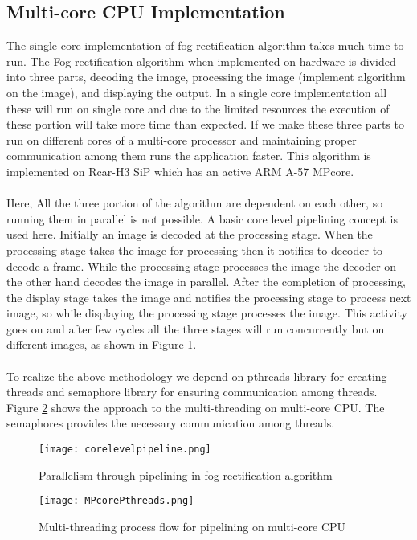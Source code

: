 \subsection{Multi-core CPU Implementation}
The single core implementation of fog rectification algorithm takes much time to run. The Fog rectification algorithm when implemented on hardware is divided into three parts, decoding the image, processing the image (implement algorithm on the image), and displaying the output. In a single core implementation all these will run on single core and due to the limited resources the execution of these portion will take more time than expected. If we make these three parts to run on different cores of a multi-core processor and maintaining proper communication among them runs the application faster. This algorithm is implemented on Rcar-H3 SiP which has an active ARM A-57 MPcore.\paragraph*{} Here, All the three portion of the algorithm are dependent on each other, so running them in parallel is not possible. A basic core level pipelining concept is used here. Initially an image is decoded at the processing stage. When the processing stage takes the image for processing then it notifies to decoder to decode a frame. While the processing stage processes the image the decoder on the other hand decodes the image in parallel.  After the completion of processing, the display stage takes the image and notifies the processing stage to process next image, so while displaying the processing stage processes the image. This activity goes on and after few cycles all the three stages will run concurrently but on different images, as shown in Figure \ref{fig:Parallelism through pipelining}.\paragraph*{} To realize the above methodology we depend on pthreads library for creating threads and semaphore library for ensuring communication among threads. Figure \ref{fig:multi-threading} shows the approach to the multi-threading on multi-core CPU. The semaphores provides the necessary communication among threads.
\begin{figure}[htb]
	\centering
	\texttt{[image: corelevelpipeline.png]}
	\caption{Parallelism through pipelining in fog rectification algorithm}
	\label{fig:Parallelism through pipelining}
\end{figure}%
\begin{figure}[h!]
	\centering
	\texttt{[image: MPcorePthreads.png]}
	\caption{Multi-threading process flow for pipelining on multi-core CPU}
	\label{fig:multi-threading}
\end{figure}%
